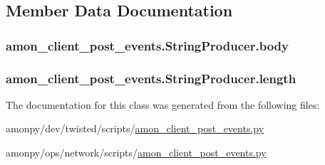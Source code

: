 \subsection{Member Data Documentation}
\hypertarget{classamon__client__post__events_1_1_string_producer_acb01bfc14e884e72b8889518e079a33e}{
\subsubsection[{body}]{\setlength{\rightskip}{0pt plus 5cm}amon\-\_\-client\-\_\-post\-\_\-events.\-String\-Producer.\-body}}\label{classamon__client__post__events_1_1_string_producer_acb01bfc14e884e72b8889518e079a33e}
\hypertarget{classamon__client__post__events_1_1_string_producer_a4ebf5f6efd6ea9c3a8d2056b5a8df28c}{
\subsubsection[{length}]{\setlength{\rightskip}{0pt plus 5cm}amon\-\_\-client\-\_\-post\-\_\-events.\-String\-Producer.\-length}}\label{classamon__client__post__events_1_1_string_producer_a4ebf5f6efd6ea9c3a8d2056b5a8df28c}


The documentation for this class was generated from the following files\-:\begin{DoxyCompactItemize}
\item 
amonpy/dev/twisted/scripts/\hyperlink{dev_2twisted_2scripts_2amon__client__post__events_8py}{amon\-\_\-client\-\_\-post\-\_\-events.\-py}\item 
amonpy/ops/network/scripts/\hyperlink{ops_2network_2scripts_2amon__client__post__events_8py}{amon\-\_\-client\-\_\-post\-\_\-events.\-py}\end{DoxyCompactItemize}

